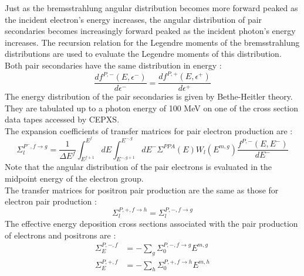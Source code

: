 Just as the bremsstrahlung angular distribution becomes more forward peaked as
the incident electron's energy increases, the angular distribution of pair
secondaries becomes increasingly forward peaked as the incident photon's
energy increases. The recursion relation for the Legendre moments of the
bremsstrahlung distributions are used to evaluate the Legendre moments of this
distribution.\\
Both pair secondaries have the same distribution in energy :
\begin{equation}
\frac{df^{P,-}(E,\epsilon^-)}{d\epsilon^-} = \frac{df^{P,+}(E,\epsilon^+)}{d\epsilon^+}
\end{equation}
The energy distribution of the pair secondaries is given by Bethe-Heitler
theory. They are tabulated up to a photon energy of 100 MeV on one of the cross
section data tapes accessed by CEPXS.\\
The expansion coefficients of transfer matrices for pair electron production
are :
\begin{equation}
\Sigma_l^{P^-,f\rightarrow g} = \frac{1}{\Delta E^f} \int_{E^{f+1}}^{E^f} dE
\int_{E^{-,g+1}}^{E^{-,g}} dE^- \Sigma^{PPA}(E) W_l(E^{m,g})
\frac{f^{P,-}(E,E^-)}{dE^-}
\end{equation}
Note that the angular distribution of the pair electrons is evaluated in the
midpoint energy of the electron group.\\
The transfer matrices for positron pair production are the same as those for
electron pair production :
\begin{equation}
\Sigma_l^{P,+,f\rightarrow h} = \Sigma_l^{P,-,f\rightarrow g}
\end{equation}
The effective energy deposition cross sections associated with the pair
production of electrons and positrons are :
\begin{align}
\Sigma_E^{P,-,f} &= -\sum_g \Sigma_0^{P,-,f\rightarrow g} E^{m,g}\\
\Sigma_E^{P,+,f} &= -\sum_h \Sigma_0^{P,+,f\rightarrow h} E^{m,h}
\end{align}

